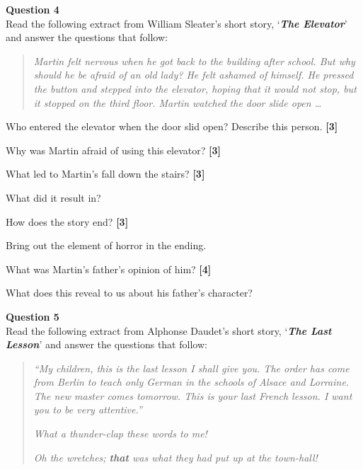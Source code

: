\documentclass[12pt,a4paper]{article}
\newcommand{\qmarks}[1]{\hfill\textbf{[#1]}}
\begin{document}
\vspace{6pt}

\textbf{Question 4}\\
Read the following extract from William Sleater's short story, `\textbf{\textit{The Elevator}}' and answer the questions that follow:

\vspace{4pt}
\begin{quote}
\textit{Martin felt nervous when he got back to the building after school. But why should he be afraid of an old lady? He felt ashamed of himself. He pressed the button and stepped into the elevator, hoping that it would not stop, but it stopped on the third floor. Martin watched the door slide open \ldots}
\end{quote}

\begin{romanenum}
    \item Who entered the elevator when the door slid open? Describe this person. \qmarks{3}

    \item Why was Martin afraid of using this elevator? \qmarks{3}

    \item What led to Martin's fall down the stairs? \qmarks{3}

    What did it result in?

    \item How does the story end? \qmarks{3}

    Bring out the element of horror in the ending.

    \item What was Martin's father's opinion of him? \qmarks{4}

    What does this reveal to us about his father's character?
\end{romanenum}

\vspace{10pt}

\textbf{Question 5}\\
Read the following extract from Alphonse Daudet's short story, `\textbf{\textit{The Last Lesson}}' and answer the questions that follow:

\vspace{4pt}
\begin{quote}
\textit{``My children, this is the last lesson I shall give you. The order has come from Berlin to teach only German in the schools of Alsace and Lorraine. The new master comes tomorrow. This is your last French lesson. I want you to be very attentive.''}

\textit{What a thunder-clap these words to me!}

\textit{Oh the wretches; \textbf{that} was what they had put up at the town-hall!}
\end{quote}
\end{document}
